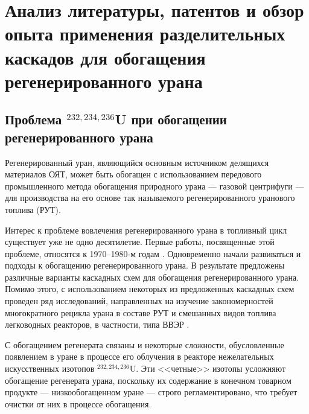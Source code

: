 \chapter{Анализ литературы, патентов и обзор опыта применения разделительных каскадов для обогащения регенерированного урана}\label{ch1}

\section{Проблема $^{232,234,236}$U при обогащении регенерированного урана}

Регенерированный уран, являющийся основным источником делящихся материалов ОЯТ, может быть обогащен с использованием передового промышленного метода обогащения природного урана --- газовой центрифуги --- для производства на его основе так называемого регенерированного уранового топлива (РУТ).

Интерес к проблеме вовлечения регенерированного урана в топливный цикл существует уже не одно десятилетие. Первые работы, посвященные этой проблеме, относятся к 1970–1980-м годам \cite{kazukihidaSimultaneousEvaluationEffects1986,sidenkoIssledovanieKaskadnyhShem,delagarzaUranium236LightWater1977,ksenof88,borodynyaIssledovanieProblemyVovlecheniya1989,raysIzgotovlenieOksidnogoTopliva1994,zhiroEkonomicheskiePreimushchestvaPererabotki1997,lebedevZamknutyyToplivnyyCikl1999,psheninZaklyuchitelnyyOtchetNIR2012}. Одновременно начали развиваться и подходы к обогащению регенерированного урана. В результате предложены различные варианты каскадных схем для обогащения регенерированного урана. Помимо этого, с использованием некоторых из предложенных каскадных схем проведен ряд исследований, направленных на изучение закономерностей многократного рецикла урана в составе РУТ и смешанных видов топлива легководных реакторов, в частности, типа ВВЭР \cite{smirnovEvolutionIsotopicComposition2012,kazukihidaSimultaneousEvaluationEffects1986,blandinskiySoglasovannyyPodhodModelirovaniyu2018,colemanEvaluationMultipleSelfrecycling2010}. 

С обогащением регенерата связаны и некоторые сложности, обусловленные появлением в уране в процессе его облучения в реакторе нежелательных искусственных изотопов $^{232,234,236}$U. Эти <<четные>> изотопы усложняют обогащение регенерата урана, поскольку их содержание в конечном товарном продукте --- низкообогащенном уране --- строго регламентировано, что требует очистки от них в процессе обогащения.

